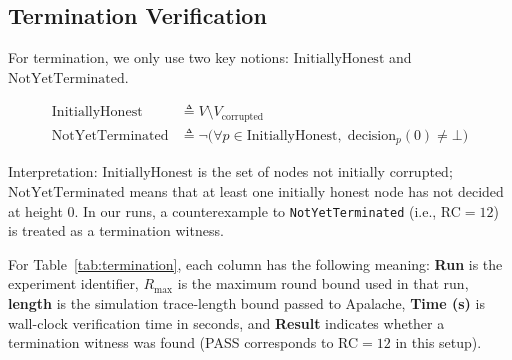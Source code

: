%
%
%   

\subsection{Termination Verification}

For termination, we only use two key notions:
\(\mathrm{InitiallyHonest}\) and \(\mathrm{NotYetTerminated}\).

\begin{align*}
\mathrm{InitiallyHonest}
&\triangleq
V \setminus V_{\mathrm{corrupted}} \\
\mathrm{NotYetTerminated}
&\triangleq
\neg\Big(\forall p\in\mathrm{InitiallyHonest},\; \mathrm{decision}_p(0)\neq \bot\Big)
\end{align*}

Interpretation:
\(\mathrm{InitiallyHonest}\) is the set of nodes not initially corrupted;
\(\mathrm{NotYetTerminated}\) means that at least one initially honest node
has not decided at height \(0\).
In our runs, a counterexample to \texttt{NotYetTerminated}
(i.e., RC\(=12\)) is treated as a termination witness.

For Table~\ref{tab:termination}, each column has the following meaning:
\textbf{Run} is the experiment identifier,
$R_{\max}$ is the maximum round bound used in that run,
\textbf{length} is the simulation trace-length bound passed to Apalache,
\textbf{Time (s)} is wall-clock verification time in seconds,
and \textbf{Result} indicates whether a termination witness was found
(PASS corresponds to RC$=12$ in this setup).


